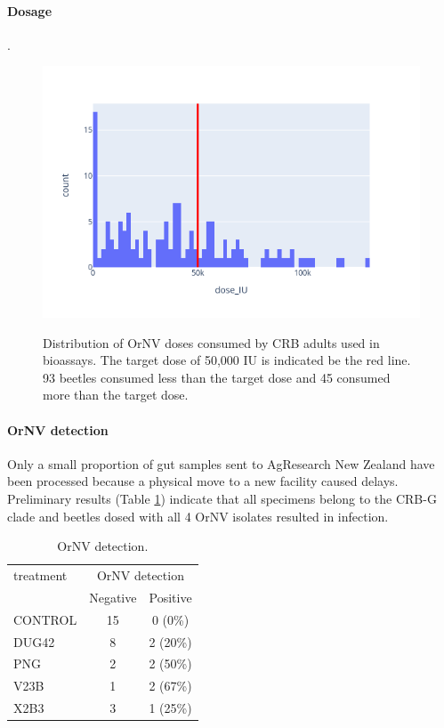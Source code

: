 \documentclass[12pt,letterpaper,english,bibliography=totocnumbered, abstract=on]{scrartcl}
\begin{document}
\clearpage

\paragraph{Dosage}.

\begin{figure}[h]
	\centering
	\caption{Distribution of OrNV doses consumed by CRB adults used in bioassays. The target dose of 50,000 IU is indicated be the red line. 93 beetles consumed less than the target dose and 45 consumed more than the target dose.}
	\includegraphics[width=0.7\linewidth]{images/dosage_distribution}
	\label{fig:dosagedistribution}
\end{figure}



\paragraph{OrNV detection}

Only a small proportion of gut samples sent to AgResearch New Zealand have been processed because a physical move to a new facility caused delays. Preliminary results (Table \ref{ornv detection}) indicate that all specimens belong to the CRB-G clade and beetles dosed with all 4 OrNV isolates resulted in infection.

\begin{table}[H]
	\centering
	\caption{OrNV detection.}
	\label{ornv detection}
	\begin{tabular}{lcc}
		\hline
		treatment  & \multicolumn{2}{c}{OrNV detection} \\ \cline{2-3}
		& Negative & Positive \\
		\hline
		CONTROL    & 15 & 0 (0\%) \\
		DUG42      & 8  & 2 (20\%) \\
		PNG        & 2  & 2 (50\%) \\		
		V23B       & 1  & 2 (67\%) \\
		X2B3       & 3  & 1 (25\%) \\
		\hline
	\end{tabular}
\end{table}
\end{document}
